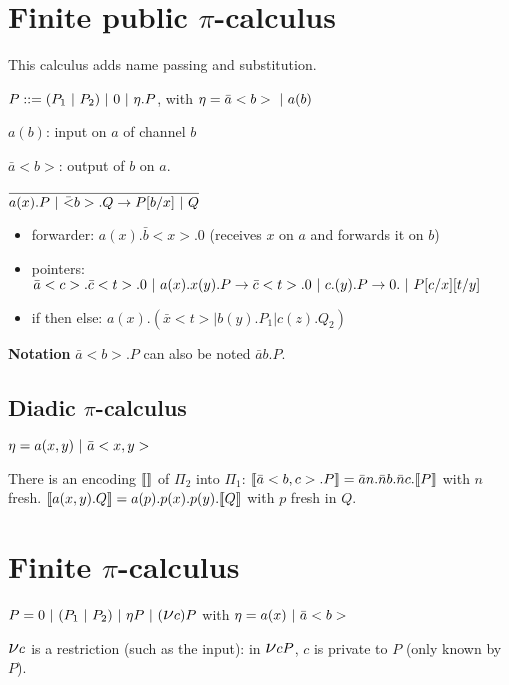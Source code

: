 \section{Finite public $\pi$-calculus}

This calculus adds name passing and substitution.

$P ::= (P_{1} \ |\  P_{2}) \ |\  0\ |\  \eta.P$, with $\eta = \bar a<b> \ |\  a(b)$

$a(b)$: input on $a$ of channel $b$

$\bar a <b>$: output of $b$ on $a$.

$\infer{a(x).P \parc \bar <b> .Q \rightarrow P[b/x]\parc Q}{}$


\begin{ex}
	\begin{itemize}
			\item forwarder: $a(x).\bar b <x>.0$ (receives $x$ on $a$ and forwards it on $b$)
			\item pointers: $\bar a <c>. \bar c <t> .0 \ |\  a(x).x(y).P \rightarrow \bar c<t>.0 \ |\  c.(y).P \rightarrow 0.\ |\  P[c/x][t/y]$
			\item if then else: $a(x).(\bar x <t> | b(y).P_{1} | c(z).Q_{2})$
	\end{itemize}
\end{ex}


\textbf{Notation} $\bar a<b>.P$ can also be noted $\bar a b.P$.

\subsection{Diadic $\pi$-calculus}
$\eta = a(x, y) \ |\  \bar a <x, y>$

There is an encoding $\llbracket \rrbracket$ of $\Pi_{2}$ into $\Pi_{1}$:
$\llbracket \bar a <b, c>.P\rrbracket = \bar a n.\bar n b.\bar n c.\llbracket P\rrbracket$ with $n$ fresh.
$\llbracket a(x,y).Q\rrbracket = a(p).p(x).p(y).\llbracket Q\rrbracket$ with $p$ fresh in $Q$.

\section{Finite $\pi$-calculus}

$P=0 \ |\  (P_1 \ |\  P_2) \ |\  \eta P \ |\  (\mbox{\Large $\nu $} c) P$
with $\eta = a(x) \ |\  \bar a<b>$

$\mbox{\Large $\nu $} c$ is a restriction (such as the input): in $\mbox{\Large $\nu $} c P$, $c$ is private to $P$ (\ie only known by $P$).

